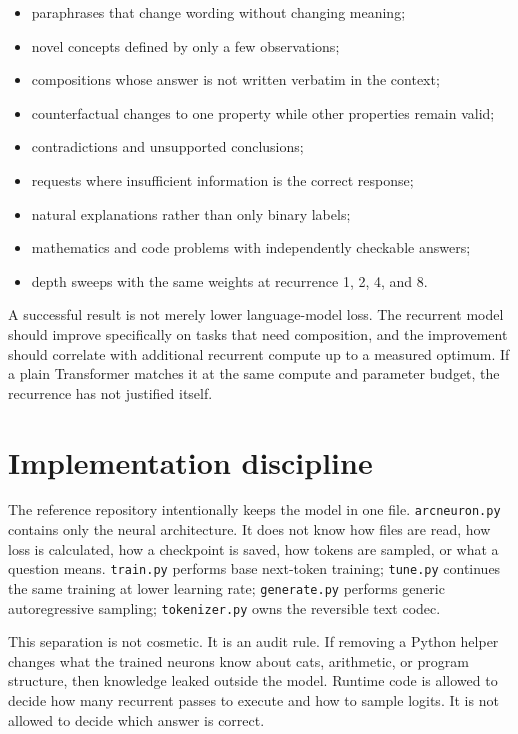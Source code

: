 \documentclass[10pt]{article}
\begin{document}
\begin{itemize}[leftmargin=1.6em]
    \item paraphrases that change wording without changing meaning;
    \item novel concepts defined by only a few observations;
    \item compositions whose answer is not written verbatim in the context;
    \item counterfactual changes to one property while other properties remain valid;
    \item contradictions and unsupported conclusions;
    \item requests where insufficient information is the correct response;
    \item natural explanations rather than only binary labels;
    \item mathematics and code problems with independently checkable answers;
    \item depth sweeps with the same weights at recurrence 1, 2, 4, and 8.
\end{itemize}

A successful result is not merely lower language-model loss. The recurrent model should improve specifically on tasks that need composition, and the improvement should correlate with additional recurrent compute up to a measured optimum. If a plain Transformer matches it at the same compute and parameter budget, the recurrence has not justified itself.

\section{Implementation discipline}

The reference repository intentionally keeps the model in one file. \texttt{arcneuron.py} contains only the neural architecture. It does not know how files are read, how loss is calculated, how a checkpoint is saved, how tokens are sampled, or what a question means. \texttt{train.py} performs base next-token training; \texttt{tune.py} continues the same training at lower learning rate; \texttt{generate.py} performs generic autoregressive sampling; \texttt{tokenizer.py} owns the reversible text codec.

This separation is not cosmetic. It is an audit rule. If removing a Python helper changes what the trained neurons know about cats, arithmetic, or program structure, then knowledge leaked outside the model. Runtime code is allowed to decide how many recurrent passes to execute and how to sample logits. It is not allowed to decide which answer is correct.
\end{document}
